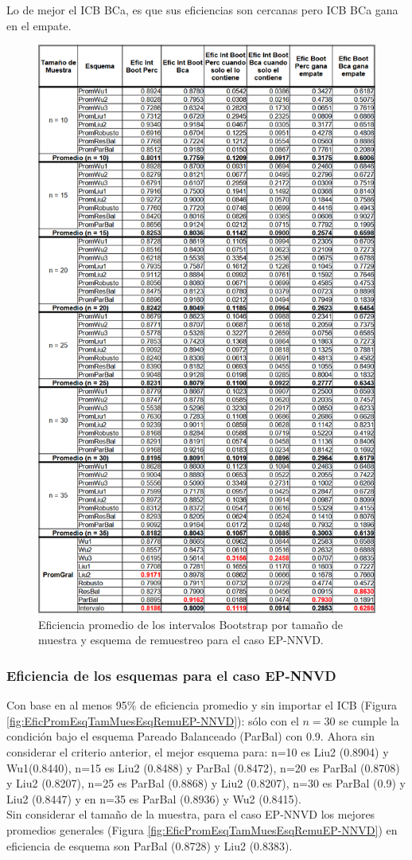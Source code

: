 Lo de mejor el ICB BCa, es que sus eficiencias son cercanas pero ICB BCa gana en el empate.\\


\begin{figure}[ht] 
	\centering 
	\includegraphics[width=0.55\linewidth]{img/EP_NNVD_Efic_Boots.png} 
	\caption{Eficiencia promedio de los intervalos Bootstrap por tamaño de muestra y esquema de remuestreo para el caso EP-NNVD.} 
	\label{fig:EficPromIntBootsTamMuestEsqRemuEP-NNVD}
\end{figure}
\FloatBarrier

\subsubsection{Eficiencia de los esquemas para el caso EP-NNVD}
Con base en al menos 95\% de eficiencia promedio y sin importar el ICB  (Figura \ref{fig:EficPromEsqTamMuesEsqRemuEP-NNVD}): sólo con el $n=30$ se cumple la condición bajo el esquema Pareado Balanceado (ParBal) con 0.9. Ahora sin considerar el criterio anterior, el mejor esquema para: n=10 es Liu2 (0.8904) y Wu1(0.8440), n=15 es Liu2 (0.8488) y ParBal (0.8472), n=20 es ParBal (0.8708) y Liu2 (0.8207), n=25 es ParBal (0.8868) y Liu2 (0.8207), n=30 es ParBal (0.9) y Liu2 (0.8447) y en n=35 es ParBal (0.8936) y Wu2 (0.8415). \\


Sin considerar el tamaño de la muestra, para el caso EP-NNVD los mejores promedios generales (Figura \ref{fig:EficPromEsqTamMuesEsqRemuEP-NNVD}) en eficiencia de esquema son ParBal (0.8728) y Liu2 (0.8383).


